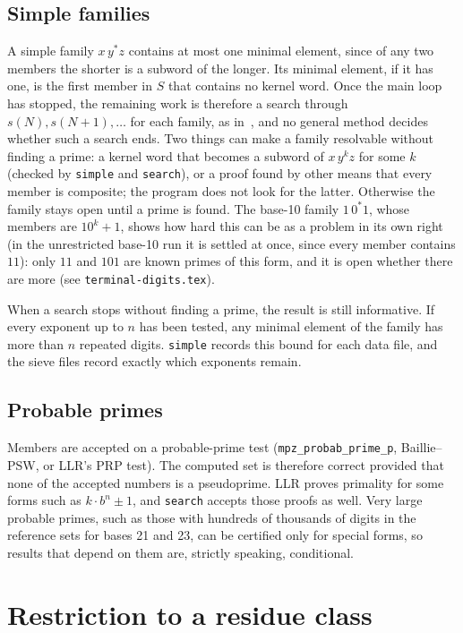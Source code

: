 \documentclass[11pt]{article}
\theoremstyle{definition}
\theoremstyle{remark}
\newcommand{\code}[1]{\texttt{#1}}
\begin{document}
\subsection{Simple families}
A simple family $x\,y^*z$ contains at most one minimal element, since of any two members the shorter is a subword of the longer. Its minimal element, if it has one, is the first member in $S$ that contains no kernel word. Once the main loop has stopped, the remaining work is therefore a search through $s(N),s(N+1),\dots$ for each family, as in~\cite{BDS}, and no general method decides whether such a search ends. Two things can make a family resolvable without finding a prime: a kernel word that becomes a subword of $x\,y^kz$ for some $k$ (checked by \code{simple} and \code{search}), or a proof found by other means that every member is composite; the program does not look for the latter. Otherwise the family stays open until a prime is found. The base-10 family $1\,0^*1$, whose members are $10^k+1$, shows how hard this can be as a problem in its own right (in the unrestricted base-10 run it is settled at once, since every member contains $11$): only $11$ and $101$ are known primes of this form, and it is open whether there are more (see \code{terminal-digits.tex}).

When a search stops without finding a prime, the result is still informative. If every exponent up to $n$ has been tested, any minimal element of the family has more than $n$ repeated digits. \code{simple} records this bound for each data file, and the sieve files record exactly which exponents remain.

\subsection{Probable primes}
Members are accepted on a probable-prime test (\code{mpz\_probab\_prime\_p}, Baillie--PSW, or LLR's PRP test). The computed set is therefore correct provided that none of the accepted numbers is a pseudoprime. LLR proves primality for some forms such as $k\cdot b^n\pm1$, and \code{search} accepts those proofs as well. Very large probable primes, such as those with hundreds of thousands of digits in the reference sets for bases 21 and 23, can be certified only for special forms, so results that depend on them are, strictly speaking, conditional.

\section{Restriction to a residue class}\label{sec:class}
\end{document}
